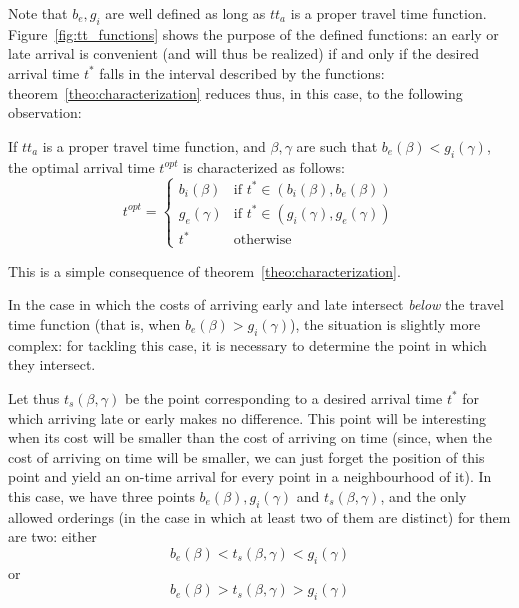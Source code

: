 Note that \(b_e, g_i\) are well defined as long as \(tt_a\) is a proper travel time function.
Figure~\ref{fig:tt_functions} shows the purpose of the defined functions:
an early or late arrival is convenient (and will thus be realized) if and only if the desired arrival time \(t^*\) falls in the interval described by the functions:
theorem~\ref{theo:characterization} reduces thus, in this case, to the following observation:
\begin{obs}
  \label{obs:char_opt_time_simple}
  If \(tt_a\) is a proper travel time function, and \(\beta, \gamma\) are such that \(b_e(\beta) < g_i(\gamma)\), the optimal arrival time \(t^{opt}\) is characterized as follows:
  \begin{equation}
    \label{eq:char_opt_time_simple}
    t^{opt} =
    \begin{cases}
      b_i(\beta) & \text{if } t^*\in(b_i(\beta), b_e(\beta)) \\
      g_e(\gamma) & \text{if } t^*\in(g_i(\gamma), g_e(\gamma)) \\
      t^* & \text{otherwise}
    \end{cases}
  \end{equation}
\end{obs}

This is a simple consequence of theorem~\ref{theo:characterization}.

In the case in which the costs of arriving early and late intersect \textit{below} the travel time function
(that is, when \(b_e(\beta) > g_i(\gamma)\)),
the situation is slightly more complex:
for tackling this case, it is necessary to determine the point in which they intersect.

Let thus \(t_s(\beta, \gamma)\) be the point corresponding to a desired arrival time \(t^*\) for which arriving late or early makes no difference.
This point will be interesting when its cost will be smaller than the cost of arriving on time (since, when the cost of arriving on time will be smaller,
we can just forget the position of this point and yield an on-time arrival for every point in a \label{eq:char_opt_time_comp}
neighbourhood of it).
In this case, we have three points \(b_e(\beta), g_i(\gamma)\) and \(t_s(\beta, \gamma)\),
and the only allowed orderings (in the case in which at least two of them are distinct) for them are two:
either
\begin{equation}\label{eq:simple_ordering}
  b_e(\beta) < t_s(\beta, \gamma) < g_i(\gamma)
\end{equation}
or
\begin{equation}\label{eq:complex_ordering}
  b_e(\beta) > t_s(\beta, \gamma) > g_i(\gamma)
\end{equation}

